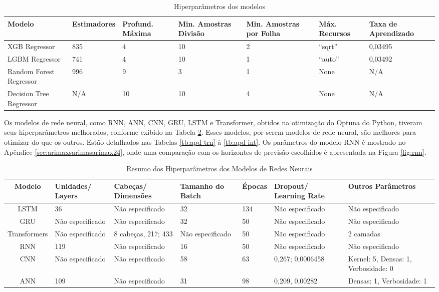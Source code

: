 \begin{table}[H]
	\centering
	\caption{Hiperparâmetros dos modelos}
	\label{tab:hiperparametros}
	\begin{tabular}{p{2.2cm}p{2.8cm}p{1.9cm}p{2cm}p{2cm}p{2cm}p{2cm}}
		\hline
		\textbf{Modelo} & \textbf{Estimadores} & \textbf{Profund. Máxima} & \textbf{Min. Amostras Divisão} & \textbf{Min. Amostras por Folha} & \textbf{Máx. Recursos} & \textbf{Taxa de Aprendizado} \\
		\hline
		XGB Regressor & 835 & 4 & 10 & 2 &``sqrt'' & 0,03495 \\
		LGBM Regressor & 741 & 4 & 10 & 1 & ``auto'' & 0,03492 \\
		Random Forest Regressor & 996 & 9 & 3 & 1 & None & N/A \\
		Decision Tree Regressor & N/A & 10 & 10 & 4 & None & N/A \\
		\hline
	\end{tabular}
	
\end{table}

Os modelos de rede neural, como RNN, ANN, CNN, GRU, LSTM e Transformer, obtidos na otimização do Optuna do Python, tiveram seus hiperparâmetros melhorados, conforme exibido na Tabela \ref{tab:hyperparameters_summary}. Esses modelos, por serem modelos de rede neural, são melhores para otimizar do que os outros. Estão detalhados nas Tabelas \ref{tb:apd-trn} à \ref{tb:apd-int}. Os parâmetros do modelo RNN é mostrado no Apêndice \ref{sec:arimaxsarimasarimax24}, onde uma comparação com os horizontes de previsão escolhidos é apresentada na Figura \ref{fig:rnn}.

\begin{table}[H]
	\centering
	\caption{Resumo dos Hiperparâmetros dos Modelos de Redes Neurais}
	\label{tab:hyperparameters_summary}
	\small
	\begin{tabular}{cp{2cm}p{2cm}p{2cm}p{2cm}p{1.5cm}p{2cm}}
		\hline
		\textbf{Modelo} & \textbf{Unidades/ Layers} & \textbf{Cabeças/ Dimensões} & \textbf{Tamanho do Batch} & \textbf{Épocas} & \textbf{Dropout/ Learning Rate} & \textbf{Outros Parâmetros} \\
		\hline
		LSTM & 36 & Não especificado & 32 & 134 & Não especificado & Não especificado \\
		\hline
		GRU & Não especificado & Não especificado & 32 & 50 & Não especificado & Não especificado \\
		\hline
		Transformers & Não especificado & 8 cabeças, 217; 433 & Não especificado & 50 & Não especificado & 2 camadas \\
		\hline
		RNN & 119 & Não especificado & 16 & 50 & Não especificado & Não especificado \\
		\hline
		CNN & Não especificado & Não especificado & 58 & 63 & 0,267; 0,0006458 & Kernel: 5, Densas: 1, Verbosidade: 0 \\
		\hline
		ANN & 109 & Não especificado & 31 & 98 & 0,209, 0,00282 & Densas: 1, Verbosidade: 1 \\
		\hline
	\end{tabular}
	
\end{table}

